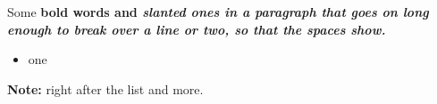 \documentclass{article}
\newenvironment{strong}{\bfseries}{}
\newenvironment{slant}{\itshape}{}
\newenvironment{note}{\textbf{Note:} }{}
\begin{document}
Some \begin{strong}bold words\end{strong} and \begin{slant}slanted ones\end{slant} in a
paragraph that goes on long enough to break over a line or two, so that the spaces show.
\begin{itemize}
\item one
\end{itemize}
\begin{note}right after the list\end{note} and more.
\end{document}
